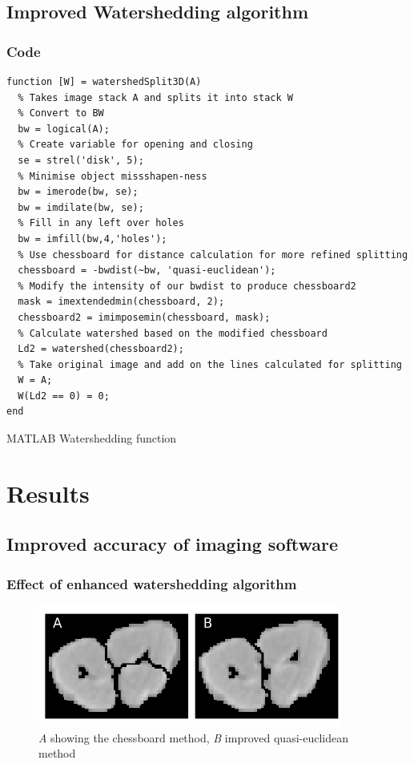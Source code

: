 \documentclass[11pt]{report}
\begin{document}
\section{Improved Watershedding algorithm}
\label{sec-3-2}

\subsection{Code}
\label{sec-3-2-1}
\begin{listing}[H]
\begin{verbatim}
function [W] = watershedSplit3D(A)
  % Takes image stack A and splits it into stack W
  % Convert to BW
  bw = logical(A);
  % Create variable for opening and closing
  se = strel('disk', 5);
  % Minimise object missshapen-ness
  bw = imerode(bw, se);
  bw = imdilate(bw, se);
  % Fill in any left over holes
  bw = imfill(bw,4,'holes');
  % Use chessboard for distance calculation for more refined splitting
  chessboard = -bwdist(~bw, 'quasi-euclidean');
  % Modify the intensity of our bwdist to produce chessboard2
  mask = imextendedmin(chessboard, 2);
  chessboard2 = imimposemin(chessboard, mask);
  % Calculate watershed based on the modified chessboard
  Ld2 = watershed(chessboard2);
  % Take original image and add on the lines calculated for splitting
  W = A;
  W(Ld2 == 0) = 0;
end
\end{verbatim}
\caption{\label{lst:ws}MATLAB Watershedding function}
\end{listing}

\chapter{Results}
\label{sec-4}

\section{Improved accuracy of imaging software}
\label{sec-4-1}

\subsection{Effect of enhanced watershedding algorithm}
\label{sec-4-1-1}
\begin{center}
\begin{figure}[htb]
\centering
\includegraphics[width=10cm]{./images/chess_quasi.png}
\caption{\label{fig:qe}\emph{A} showing the chessboard method, \emph{B} improved quasi-euclidean method}
\end{figure}
\end{center}
\end{document}
